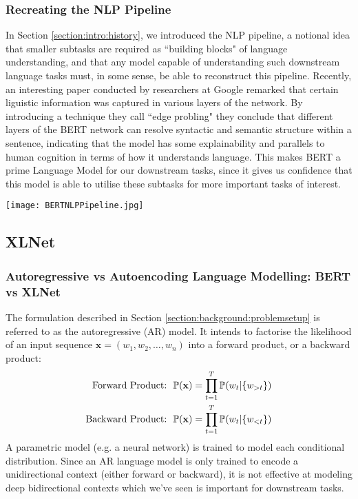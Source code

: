 {{\subsubsection{Recreating the NLP Pipeline}
In Section \ref{section:intro:history}, we introduced the NLP pipeline, a notional idea that smaller subtasks are required as ``building blocks" of language understanding, and that any model capable of understanding such downstream language tasks must, in some sense, be able to reconstruct this pipeline. Recently, an interesting paper \cite{Tenney2019} conducted by researchers at Google remarked that certain liguistic information was captured in various layers of the network. By introducing a technique they call ``edge probling" they conclude that different layers of the BERT network can resolve syntactic and semantic structure within a sentence, indicating that the model has some explainability and parallels to human cognition in terms of how it understands language. This makes BERT a prime Language Model for our downstream tasks, since it gives us confidence that this model is able to utilise these subtasks for more important tasks of interest.

\begin{center}
	\texttt{[image: BERTNLPPipeline.jpg]}
\end{center}

\subsection{XLNet} \label{section:background:xlnet}
\subsubsection{Autoregressive vs Autoencoding Language Modelling: BERT vs XLNet}
The formulation described in Section \ref{section:background:problemsetup} is referred to as the autoregressive (AR) model. It intends to factorise the likelihood of an input sequence $\mathbf{x} = (w_1, w_2, \dots, w_n)$ into a forward product, or a backward product:
\begin{align*}
\text{Forward Product:} \ & \ \P(\mathbf{x}) = \prod \limits_{t=1}^{T} \P(w_t | \{w_{>t}\}) \\
\text{Backward Product:} \ & \ \P(\mathbf{x}) = \prod \limits_{t=1}^{T} \P(w_t | \{w_{<t}\}) 
\end{align*}
A parametric model (e.g. a neural network) is trained to model each conditional distribution. Since an AR language model is only trained to encode a unidirectional context (either forward or backward), it is not effective at modeling deep bidirectional contexts which we've seen is important for downstream tasks.

}}
